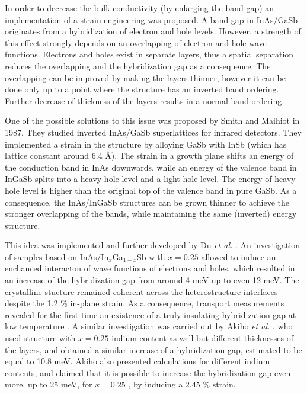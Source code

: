 \documentclass[titlepage,a4paper]{book}
\begin{document}
In order to decrease the bulk conductivity (by enlarging the band gap) an implementation of a strain engineering was proposed. A band gap in InAs/GaSb originates from a hybridization of electron and hole levels. However, a strength of this effect strongly depends on an overlapping of electron and hole wave functions. Electrons and holes exist in separate layers, thus a spatial separation reduces the overlapping and the hybridization gap as a consequence. The overlapping can be improved by making the layers thinner, however it can be done only up to a point where the structure has an inverted band ordering. Further decrease of thickness of the layers results in a normal band ordering.

One of the possible solutions to this issue was proposed \cite{Smith_State} by Smith and Maihiot in 1987. They studied inverted InAs/GaSb superlattices for infrared detectors. They implemented a strain in the structure by alloying GaSb with InSb (which has lattice constant around 6.4 Å). The strain in a growth plane shifts an energy of the conduction band in InAs downwards, while an energy of the valence band in InGaSb splits into a heavy hole level and a light hole level. The energy of heavy hole level is higher than the original top of the valence band in pure GaSb. As a consequence, the InAs/InGaSb structures can be grown thinner to achieve the stronger overlapping of the bands, while maintaining the same (inverted) energy structure.

This idea was implemented and further developed by Du \textit{et al.} \cite{Du_State2}. An investigation of samples based on InAs/In$_x$Ga$_{1-x}$Sb with $x = 0.25$ allowed to induce an enchanced interacton of wave functions of electrons and holes, which resulted in an increase of the hybridization gap from around 4 meV up to even 12 meV. The crystalline stucture remained coherent across the heterostructure interfaces despite the 1.2 \% in-plane strain. As a consequence, transport measurements revealed for the first time an existence of a truly insulating hybridization gap at low temperature \cite{Du_State2}. A similar investigation was carried out by Akiho \textit{et al.} \cite{Akiho_State}, who used structure with $x = 0.25$ indium content as well but different thicknesses of the layers, and obtained a similar increase of a hybridization gap, estimated to be equal to 10.8 meV. Akiho also presented calculations for different indium contents, and claimed that it is possible to increase the hybridization gap even more, up to 25 meV, for $x = 0.25$ \cite{Akiho_State}, by inducing a 2.45 \% strain.
\end{document}
